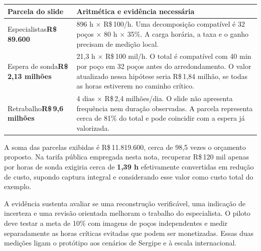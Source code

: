 \documentclass[11pt,a4paper]{article}
\newcommand{\rs}{R\$\,}
\newcommand{\minor}[1]{\par\medskip{\sffamily\bfseries\color{forest}#1}\par}
\begin{document}
\begin{center}
\small
\begin{tabularx}{\linewidth}{@{}p{.26\linewidth}Y@{}}
\toprule
\textbf{Parcela do slide} & \textbf{Aritmética e evidência necessária} \\
\midrule
Especialistas\newline \textbf{\rs89.600}
  & 896 h $\times$ \rs100/h. Uma decomposição compatível é 32 poços $\times$ 80 h $\times$ 35\%. A carga horária, a taxa e o ganho precisam de medição local. \\
Espera de sonda\newline \textbf{\rs2,13 milhões}
  & 21,3 h $\times$ \rs100 mil/h. O total é compatível com 40 min por poço em 32 poços antes do arredondamento. O valor atualizado nessa hipótese seria \rs1,84 milhão, se todas as horas estiverem no caminho crítico. \\
Retrabalho\newline \textbf{\rs9,6 milhões}
  & 4 dias $\times$ \rs2,4 milhões/dia. O slide não apresenta frequência nem duração observadas. A parcela representa cerca de 81\% do total e pode coincidir com a espera já valorizada. \\
\bottomrule
\end{tabularx}
\end{center}

A soma das parcelas exibidas é \rs11.819.600, cerca de 98,5 vezes o orçamento proposto. Na tarifa pública empregada nesta nota, recuperar \rs120 mil apenas por horas de sonda exigiria cerca de \textbf{1,39 h} efetivamente convertidas em redução de custo, supondo captura integral e considerando esse valor como custo total do exemplo.

\minor{Conclusão}
A evidência sustenta avaliar se uma reconstrução verificável, uma indicação de incerteza e uma revisão orientada melhoram o trabalho do especialista. O piloto deve testar a meta de 10\% com imagens de poços independentes e medir separadamente as horas críticas evitadas que podem ser monetizadas. Essas duas medições ligam o protótipo aos cenários de Sergipe e à escala internacional.
\end{document}

